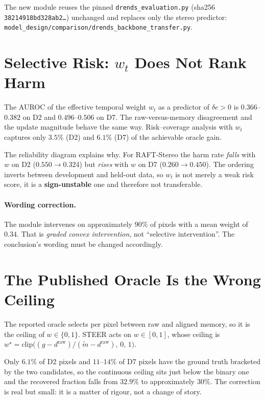 \documentclass[11pt,a4paper]{article}
\begin{document}
The new module reuses the pinned \texttt{drends\_evaluation.py}
(sha256 \texttt{38214918bd328ab2\ldots}) unchanged and replaces only
the stereo predictor:
\texttt{model\_design/comparison/drends\_backbone\_transfer.py}.

\section*{Selective Risk: $w_t$ Does Not Rank Harm}

The AUROC of the effective temporal weight $w_t$ as a predictor of
$\delta e > 0$ is $0.366$--$0.382$ on D2 and $0.496$--$0.506$ on D7.
The raw-versus-memory disagreement and the update magnitude behave the
same way. Risk--coverage analysis with $w_t$ captures only $3.5\%$
(D2) and $6.1\%$ (D7) of the achievable oracle gain.

The reliability diagram explains why. For RAFT-Stereo the harm rate
\emph{falls} with $w$ on D2 ($0.550 \rightarrow 0.324$) but
\emph{rises} with $w$ on D7 ($0.260 \rightarrow 0.450$). The ordering
inverts between development and held-out data, so $w_t$ is not merely
a weak risk score, it is a \textbf{sign-unstable} one and therefore
not transferable.

\paragraph{Wording correction.}
The module intervenes on approximately $90\%$ of pixels with a mean
weight of $0.34$. That is \emph{graded convex intervention}, not
``selective intervention''. The conclusion's wording must be changed
accordingly.

\section*{The Published Oracle Is the Wrong Ceiling}

The reported oracle selects per pixel between raw and aligned memory,
so it is the ceiling of $w \in \{0,1\}$. STEER acts on $w \in [0,1]$,
whose ceiling is
$w^{\star} = \mathrm{clip}\big((g - d^{\text{raw}}) /
(\widetilde{m} - d^{\text{raw}}),\,0,\,1\big)$.

Only $6.1\%$ of D2 pixels and $11$--$14\%$ of D7 pixels have the
ground truth bracketed by the two candidates, so the continuous
ceiling sits just below the binary one and the recovered fraction
falls from $32.9\%$ to approximately $30\%$. The correction is real
but small: it is a matter of rigour, not a change of story.
\end{document}
